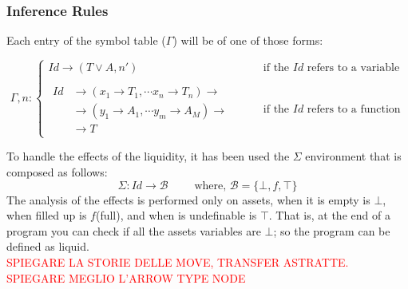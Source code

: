 \documentclass[11pt]{article} %
\newcommand{\ES}{\textcolor{red}}
\begin{document}
\subsubsection{Inference Rules}
Each entry of the symbol table ($ \Gamma $) will be of one of those forms:

\begin{equation}
\Gamma, n :
	\begin{cases}
	Id \rightarrow ( T \lor A, n' ) \qquad & \text{if the } Id \text{ refers to a variable} \\ \\
	\begin{split}
	Id & \rightarrow  (x_1 \rightarrow T_1,\cdots
          							 x_n \rightarrow T_n) \rightarrow \\
          		   &		\rightarrow (y_1 \rightarrow A_1,\cdots
          							 y_m \rightarrow A_M) \rightarrow \\
          		   &		\rightarrow T 
	\end{split} \qquad & \text{if the } Id \text{ refers to a function}
	\end{cases}
\end{equation}

To handle the effects of the liquidity, it has been used the $\Sigma$ environment that is composed as follows: \\ 
\[
\Sigma : Id \rightarrow \mathcal{B} \qquad
\text{ where, } \mathcal{B} =\{ \bot, f , \top \}
\]
The analysis of the effects is performed only on assets, when it is empty is $\bot$, when filled up is $f$(full), and when is undefinable is $\top$. That is, at the end of a program you can check if all the assets variables are $\bot$; so the program can be defined as liquid.
 \\
\ES{SPIEGARE LA STORIE DELLE MOVE, TRANSFER ASTRATTE.\\SPIEGARE MEGLIO L'ARROW TYPE NODE}

\medskip
\end{document}

